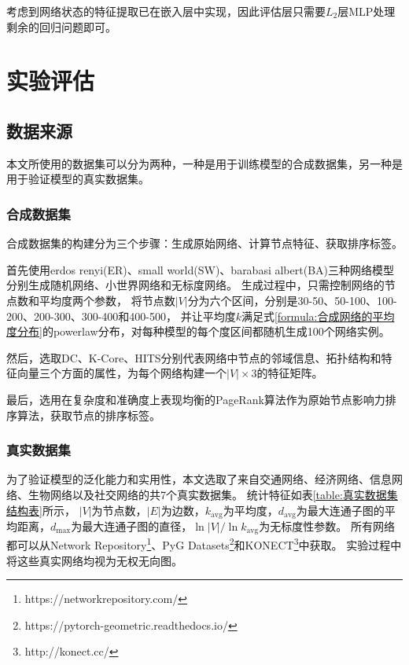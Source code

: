\documentclass[twocolumn]{morningstar}
\begin{document}
考虑到网络状态的特征提取已在嵌入层中实现，因此评估层只需要$L_2$层MLP处理剩余的回归问题即可。


\section{实验评估}\label{sec:ExperimentalEvaluation}

\subsection{数据来源}\label{sec:DataCollection}

本文所使用的数据集可以分为两种，一种是用于训练模型的合成数据集，另一种是用于验证模型的真实数据集。


\subsubsection{合成数据集}\label{sec:SyntheticDataset}

合成数据集的构建分为三个步骤：生成原始网络、计算节点特征、获取排序标签。

首先使用erdos renyi(ER)、small world(SW)、barabasi albert(BA)三种网络模型分别生成随机网络、小世界网络和无标度网络。
生成过程中，只需控制网络的节点数和平均度两个参数，
将节点数$|V|$分为六个区间，分别是30-50、50-100、100-200、200-300、300-400和400-500，
并让平均度$k$满足式\ref{formula:合成网络的平均度分布}的powerlaw分布，对每种模型的每个度区间都随机生成100个网络实例。



然后，选取DC、K-Core、HITS分别代表网络中节点的邻域信息、拓扑结构和特征向量三个方面的属性，为每个网络构建一个$|V|\times3$的特征矩阵。

最后，选用在复杂度和准确度上表现均衡的PageRank算法作为原始节点影响力排序算法，获取节点的排序标签。


\subsubsection{真实数据集}\label{sec:RealDataset}



为了验证模型的泛化能力和实用性，本文选取了来自交通网络、经济网络、信息网络、生物网络以及社交网络的共7个真实数据集。
统计特征如表\ref{table:真实数据集结构表}所示，
$|V|$为节点数，$|E|$为边数，$k_{\mathrm{avg}}$为平均度，$d_{\mathrm{avg}}$为最大连通子图的平均距离，$d_{\mathrm{max}}$为最大连通子图的直径，$\ln |V|/\ln k_\mathrm{avg}$为无标度性参数。
所有网络都可以从Network Repository\footnote{https://networkrepository.com/}、PyG Datasets\footnote{https://pytorch-geometric.readthedocs.io/}和KONECT\footnote{http://konect.cc/}中获取。
实验过程中将这些真实网络均视为无权无向图。
\end{document}

